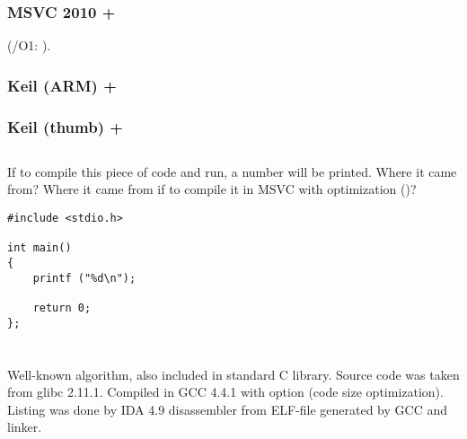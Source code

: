 \subsubsection{MSVC 2010 + }

(/O1: ).



\subsubsection{Keil (ARM) + \Othree}



\subsubsection{Keil (thumb) + \Othree}



\subsection{}

{If to compile this piece of code and run, a number will be printed. Where it came from?
Where it came from if to compile it in MSVC with optimization (\Ox)?}

\begin{lstlisting}
#include <stdio.h>

int main()
{
	printf ("%d\n");

	return 0;
};
\end{lstlisting}

\section{}

\subsection{}

{Well-known algorithm, also included in standard C library. Source code was taken from glibc 2.11.1.
Compiled in GCC 4.4.1 with  option (code size optimization).
Listing was done by IDA 4.9 disassembler from ELF-file generated by GCC and linker.}

